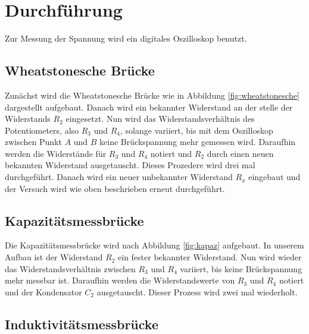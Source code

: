 \section{Durchführung}
\label{sec:Durchführung}

Zur Messung der Spannung wird ein digitales Oszilloskop benutzt.

\subsection{Wheatstonesche Brücke}

Zunächst wird die Wheatstonesche Brücke wie in Abbildung \ref{fig:wheatstonesche} dargestellt aufgebaut.
Danach wird ein bekannter Widerstand an der stelle der Widerstands $R_2$ eingesetzt.
Nun wird das Widerstandsverhältnis des Potentiometers, also $R_3$ und $R_4$, solange variiert, bis mit dem Oszilloskop zwischen Punkt $A$ und $B$ keine Brückspannung mehr gemessen wird.
Daraufhin werden die Widerstände für $R_3$ und $R_4$ notiert und $R_2$ durch einen neuen bekannten Widerstand ausgetauscht.
Dieses Prozedere wird drei mal durchgeführt.
Danach wird ein neuer unbekannter Widerstand $R_x$ eingebaut und der Versuch wird wie oben beschrieben erneut durchgeführt.

\subsection{Kapazitätsmessbrücke}

Die Kapazitätsmessbrücke wird nach Abbildung \ref{fig:kapaz} aufgebaut.
In unserem Aufbau ist der Widerstand $R_2$ ein fester bekannter Widerstand.
Nun wird wieder das Widerstandsverhältnis zwischen $R_3$ und $R_4$ variiert, bis keine Brückspannung mehr messbar ist.
Daraufhin werden die Widerstandswerte von $R_3$ und $R_4$ notiert und der Kondensator $C_2$ ausgetauscht.
Dieser Prozess wird zwei mal wiederholt.

\subsection{Induktivitätsmessbrücke}